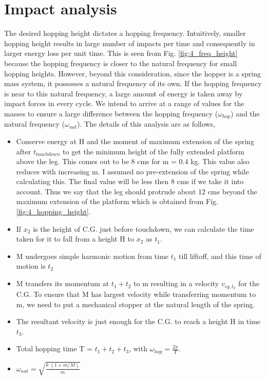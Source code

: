 \section{Impact analysis}
\label{sec:4_impact}
The desired hopping height dictates a hopping frequency. Intuitively, smaller hopping height results in large number of impacts per time
and consequently in larger energy loss per unit time. This is seen from Fig. \ref{fig:4_freq_height} because the hopping frequency is closer to the natural frequency for small hopping heights. However, beyond this consideration, since the hopper is a spring mass
system, it possesses a natural frequency of its own. If the hopping frequency is near to this natural frequency, a large
amount of energy is taken away by impact forces in every cycle. We intend to arrive at a range of values for the masses
to ensure a large difference between the hopping frequency ($\omega_{hop}$) and the natural frequency ($\omega_{nat}$).
The details of this analysis are as follows,
\begin{itemize}
\item 
Conserve energy at H and the moment of maximum extension of the spring after $t_{touchdown}$ to get the minimum height of the
fully extended platform above the leg. This comes out to be 8 cms for m = 0.4 kg. This value also reduces with increasing m. I
assumed no pre-extension of the spring while calculating this. The final value will be less then 8 cms if we take it into account.
Thus we say that the leg should protrude about 12 cms beyond the maximum extension of the platform which is obtained from Fig.
\ref{fig:4_hopping_height}.
\item
If $x_2$ is the height of C.G. just before touchdown, we can calculate the time taken for it to fall from a height H to $x_2$ as
$t_1$.
\item
M undergoes simple harmonic motion from time $t_1$ till liftoff, and this time of motion is $t_2$
\item
M transfers its momentum at $t_1 + t_2$ to m resulting in a velocity $v_{cg, t_{2}}$ for the C.G. To ensure that M has largest
velocity while transferring momentum to m, we need to put a mechanical stopper at the natural length of the spring.
\item
The resultant velocity is just enough for the C.G. to reach a height H in time $t_3$.
\item
Total hopping time T = $t_1 + t_2 + t_3$, with $\omega_{hop} = \frac{2\pi}{T}$.
\item
$\omega_{nat} = \sqrt{\frac{k\;(1+m/M)}{m}}$
\end{itemize}

